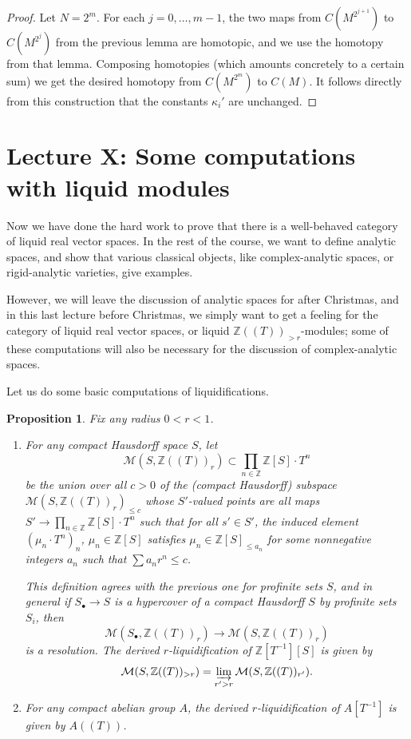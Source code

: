 \documentclass[11pt]{amsbook}
\numberwithin{equation}{section}
\numberwithin{theorem}{section}
\newtheorem{proposition}[theorem]{Proposition}
\theoremstyle{definition}
\begin{document}
\begin{proof} Let $N=2^m$. For each $j=0,\ldots,m-1$, the two maps from $C(M^{2^{j+1}})$ to $C(M^{2^j})$ from the previous lemma are homotopic, and we use the homotopy from that lemma. Composing homotopies (which amounts concretely to a certain sum) we get the desired homotopy from $C(M^{2^m})$ to $C(M)$. It follows directly from this construction that the constants $\kappa_i'$ are unchanged.
\end{proof}

\newpage

\section{Lecture X: Some computations with liquid modules}

Now we have done the hard work to prove that there is a well-behaved category of liquid real vector spaces. In the rest of the course, we want to define analytic spaces, and show that various classical objects, like complex-analytic spaces, or rigid-analytic varieties, give examples.

However, we will leave the discussion of analytic spaces for after Christmas, and in this last lecture before Christmas, we simply want to get a feeling for the category of liquid real vector spaces, or liquid $\mathbb Z((T))_{>r}$-modules; some of these computations will also be necessary for the discussion of complex-analytic spaces.

Let us do some basic computations of liquidifications.

\begin{proposition}\label{prop:computeliquidification} Fix any radius $0<r<1$.
\begin{enumerate}
\item For any compact Hausdorff space $S$, let
\[
\mathcal M(S,\mathbb Z((T))_r)\subset \prod_{n\in \mathbb Z}\mathbb Z[S]\cdot T^n
\]
be the union over all $c>0$ of the (compact Hausdorff) subspace $\mathcal M(S,\mathbb Z((T))_r)_{\leq c}$ whose $S'$-valued points are all maps $S'\to \prod_{n\in \mathbb Z}\mathbb Z[S]\cdot T^n$ such that for all $s'\in S'$, the induced element $(\mu_n\cdot T^n)_n$, $\mu_n\in \mathbb Z[S]$ satisfies $\mu_n\in \mathbb Z[S]_{\leq a_n}$ for some nonnegative integers $a_n$ such that $\sum a_n r^n\leq c$.

This definition agrees with the previous one for profinite sets $S$, and in general if $S_\bullet\to S$ is a hypercover of a compact Hausdorff $S$ by profinite sets $S_i$, then
\[
\mathcal M(S_\bullet,\mathbb Z((T))_r)\to \mathcal M(S,\mathbb Z((T))_r)
\]
is a resolution. The derived $r$-liquidification of $\mathbb Z[T^{-1}][S]$ is given by
\[
\mathcal M(S,\mathbb Z((T))_{>r}) = \varinjlim_{r'>r} \mathcal M(S,\mathbb Z((T))_{r'}).
\]
\item For any compact abelian group $A$, the derived $r$-liquidification of $A[T^{-1}]$ is given by $A((T))$.
\end{enumerate}
\end{proposition}
\end{document}
